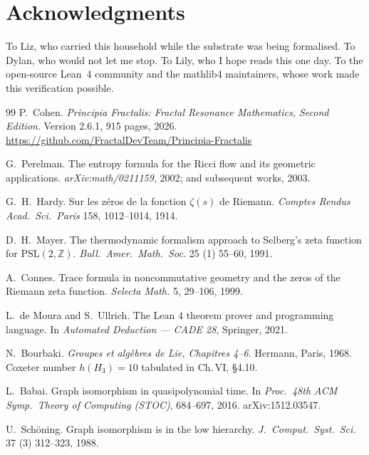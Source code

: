 \documentclass[11pt,a4paper]{amsart}
\theoremstyle{plain}
\theoremstyle{definition}
\begin{document}
\section*{Acknowledgments}

To Liz, who carried this household while the substrate was being formalised. To Dylan, who would not let me stop. To Lily, who I hope reads this one day. To the open-source Lean~4 community and the mathlib4 maintainers, whose work made this verification possible.

\begin{thebibliography}{99}
P.~Cohen.
\newblock \emph{Principia Fractalis: Fractal Resonance Mathematics, Second Edition}.
\newblock Version 2.6.1, 915 pages, 2026.
\newblock \url{https://github.com/FractalDevTeam/Principia-Fractalis}

G.~Perelman.
\newblock The entropy formula for the Ricci flow and its geometric applications.
\newblock \emph{arXiv:math/0211159}, 2002; and subsequent works, 2003.

G.~H.~Hardy.
\newblock Sur les z\'eros de la fonction $\zeta(s)$ de Riemann.
\newblock \emph{Comptes Rendus Acad.\ Sci.\ Paris} 158, 1012--1014, 1914.

D.~H.~Mayer.
\newblock The thermodynamic formalism approach to Selberg's zeta function for $\mathrm{PSL}(2,\mathbb{Z})$.
\newblock \emph{Bull.\ Amer.\ Math.\ Soc.} 25 (1) 55--60, 1991.

A.~Connes.
\newblock Trace formula in noncommutative geometry and the zeros of the Riemann zeta function.
\newblock \emph{Selecta Math.} 5, 29--106, 1999.

L.~de Moura and S.~Ullrich.
\newblock The Lean 4 theorem prover and programming language.
\newblock In \emph{Automated Deduction --- CADE 28}, Springer, 2021.

N.~Bourbaki.
\newblock \emph{Groupes et alg\`ebres de Lie, Chapitres 4--6}.
\newblock Hermann, Paris, 1968.
\newblock Coxeter number $h(H_3) = 10$ tabulated in Ch.\,VI, \S 4.10.

L.~Babai.
\newblock Graph isomorphism in quasipolynomial time.
\newblock In \emph{Proc.\ 48th ACM Symp.\ Theory of Computing (STOC)}, 684--697, 2016.
\newblock arXiv:1512.03547.

U.~Sch\"oning.
\newblock Graph isomorphism is in the low hierarchy.
\newblock \emph{J.\ Comput.\ Syst.\ Sci.} 37 (3) 312--323, 1988.


\end{thebibliography}
\end{document}
